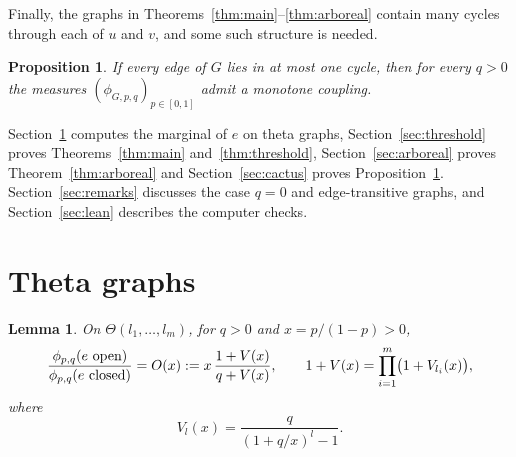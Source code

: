 \documentclass[11pt]{amsart}
\newtheorem{proposition}[theorem]{Proposition}
\newtheorem{lemma}[theorem]{Lemma}
\theoremstyle{remark}
\numberwithin{equation}{section}
\newcommand{\open}{\ \textup{open}}
\begin{document}
Finally, the graphs in Theorems~\ref{thm:main}--\ref{thm:arboreal} contain many cycles through each of $u$ and $v$, and some such structure is needed.

\begin{proposition}\label{prop:cactus}
If every edge of $G$ lies in at most one cycle, then for every $q>0$ the measures $(\phi_{G,p,q})_{p\in[0,1]}$ admit a monotone coupling.
\end{proposition}

Section~\ref{sec:theta} computes the marginal of $e$ on theta graphs, Section~\ref{sec:threshold} proves Theorems~\ref{thm:main} and~\ref{thm:threshold}, Section~\ref{sec:arboreal} proves Theorem~\ref{thm:arboreal} and Section~\ref{sec:cactus} proves Proposition~\ref{prop:cactus}. Section~\ref{sec:remarks} discusses the case $q=0$ and edge-transitive graphs, and Section~\ref{sec:lean} describes the computer checks.

\section{Theta graphs}\label{sec:theta}

\begin{lemma}\label{lem:theta}
On $\Theta(l_1,\dots,l_m)$, for $q>0$ and $x=p/(1-p)>0$,
\begin{equation}\label{eq:odds}
 \frac{\phi_{p,q}(e\open)}{\phi_{p,q}(e\ \textup{closed})}=O(x):=x\,\frac{1+V(x)}{q+V(x)},\qquad 1+V(x)=\prod_{i=1}^m\bigl(1+V_{l_i}(x)\bigr),
\end{equation}
where
\[
 V_l(x)=\frac{q}{(1+q/x)^l-1}.
\]
\end{lemma}
\end{document}
